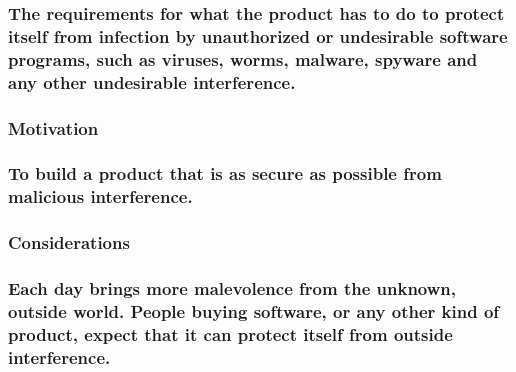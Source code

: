 \documentclass[
]{article}
\begin{document}
\hypertarget{the-requirements-for-what-the-product-has-to-do-to-protect-itself-from-infection-by-unauthorized-or-undesirable-software-programs-such-as-viruses-worms-malware-spyware-and-any-other-undesirable-interference.}{%
\subsubsection{\texorpdfstring{The requirements for what the product has
to do to protect itself from infection by unauthorized or undesirable
software programs, such as viruses, worms, malware, spyware and any
other undesirable interference.
}{The requirements for what the product has to do to protect itself from infection by unauthorized or undesirable software programs, such as viruses, worms, malware, spyware and any other undesirable interference. }}\label{the-requirements-for-what-the-product-has-to-do-to-protect-itself-from-infection-by-unauthorized-or-undesirable-software-programs-such-as-viruses-worms-malware-spyware-and-any-other-undesirable-interference.}}

\hypertarget{motivation-55}{%
\subsubsection{Motivation}\label{motivation-55}}

\hypertarget{to-build-a-product-that-is-as-secure-as-possible-from-malicious-interference.}{%
\subsubsection{To build a product that is as secure as possible from
malicious
interference.}\label{to-build-a-product-that-is-as-secure-as-possible-from-malicious-interference.}}

\hypertarget{considerations-40}{%
\subsubsection{Considerations}\label{considerations-40}}

\hypertarget{each-day-brings-more-malevolence-from-the-unknown-outside-world.-people-buying-software-or-any-other-kind-of-product-expect-that-it-can-protect-itself-from-outside-interference.}{%
\subsubsection{Each day brings more malevolence from the unknown,
outside world. People buying software, or any other kind of product,
expect that it can protect itself from outside
interference.}\label{each-day-brings-more-malevolence-from-the-unknown-outside-world.-people-buying-software-or-any-other-kind-of-product-expect-that-it-can-protect-itself-from-outside-interference.}}
\end{document}
